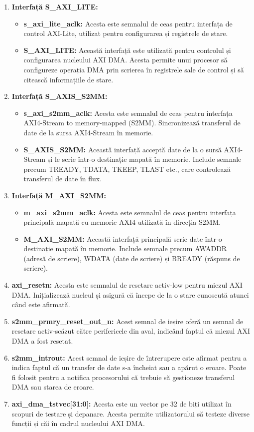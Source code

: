 \documentclass[12pt]{article}
\begin{document}
\begin{enumerate}
    \item \textbf{Interfață S\_AXI\_LITE:}
    \begin{itemize}
        \item \textbf{s\_axi\_lite\_aclk:} Acesta este semnalul de ceas pentru interfața de control AXI-Lite, utilizat pentru configurarea și registrele de stare.
        \item \textbf{S\_AXI\_LITE:} Această interfață este utilizată pentru controlul și configurarea nucleului AXI DMA. Acesta permite unui procesor să configureze operația DMA prin scrierea în registrele sale de control și să citească informațiile de stare.
    \end{itemize}
    \item \textbf{Interfață S\_AXIS\_S2MM:}
    \begin{itemize}
        \item \textbf{s\_axi\_s2mm\_aclk:} Acesta este semnalul de ceas pentru interfața AXI4-Stream to memory-mapped (S2MM). Sincronizează transferul de date de la sursa AXI4-Stream în memorie.
        \item \textbf{S\_AXIS\_S2MM:} Această interfață acceptă date de la o sursă AXI4-Stream și le scrie într-o destinație mapată în memorie. Include semnale precum TREADY, TDATA, TKEEP, TLAST etc., care controlează transferul de date în flux.
    \end{itemize}
    \item \textbf{Interfață M\_AXI\_S2MM:}
    \begin{itemize}
        \item \textbf{m\_axi\_s2mm\_aclk:} Acesta este semnalul de ceas pentru interfața principală mapată cu memorie AXI4 utilizată în direcția S2MM.
        \item \textbf{M\_AXI\_S2MM:} Această interfață principală scrie date într-o destinație mapată în memorie. Include semnale precum AWADDR (adresă de scriere), WDATA (date de scriere) și BREADY (răspuns de scriere).
    \end{itemize}
    \item \textbf{axi\_resetn:} Acesta este semnalul de resetare activ-low pentru miezul AXI DMA. Inițializează nucleul și asigură că începe de la o stare cunoscută atunci când este afirmată.
    \item \textbf{s2mm\_prmry\_reset\_out\_n:} Acest semnal de ieșire oferă un semnal de resetare activ-scăzut către perifericele din aval, indicând faptul că miezul AXI DMA a fost resetat.
    \item \textbf{s2mm\_introut:} Acest semnal de ieșire de întrerupere este afirmat pentru a indica faptul că un transfer de date s-a încheiat sau a apărut o eroare. Poate fi folosit pentru a notifica procesorului că trebuie să gestioneze transferul DMA sau starea de eroare.
    \item \textbf{axi\_dma\_tstvec[31:0]:} Acesta este un vector pe 32 de biți utilizat în scopuri de testare și depanare. Acesta permite utilizatorului să testeze diverse funcții și căi în cadrul nucleului AXI DMA.
\end{enumerate}
\end{document}
